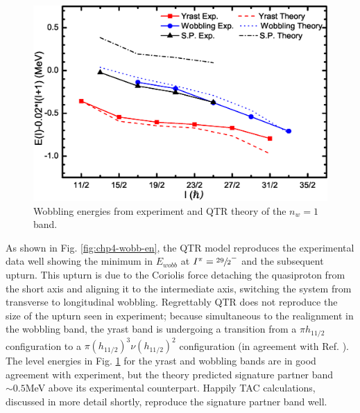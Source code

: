 \begin{figure}[b!]
\centerline{\includegraphics[width=\textwidth]{./img/c4/en_minus_rotor.eps}}
	\caption{Wobbling energies from experiment and QTR theory of the $n_w=1$ band.\label{fig:chp4-qtr-en-minus-rotor}}
\end{figure}

As shown in Fig. \ref{fig:chp4-wobb-en}, the QTR model reproduces the experimental data well showing the minimum in $E_{wobb}$ at $I^{\pi}=\sfrac{29}{2}^-$ and the subsequent upturn. This upturn is due to the Coriolis force detaching the quasiproton from the short axis and aligning it to the intermediate axis, switching the system from transverse to longitudinal wobbling. Regrettably QTR does not reproduce the size of the upturn seen in experiment; because simultaneous to the realignment in the wobbling band, the yrast band is undergoing a transition from a $\pi{}h_{11/2}$ configuration to a $\pi(h_{11/2})^3\nu(h_{11/2})^2$ configuration (in agreement with Ref. \cite{ePaul135Pr}). The level energies in Fig. \ref{fig:chp4-qtr-en-minus-rotor} for the yrast and wobbling bands are in good agreement with experiment, but the theory predicted signature partner band $\sim0.5$MeV above its experimental counterpart. Happily TAC calculations, discussed in more detail shortly, reproduce the signature partner band well.

